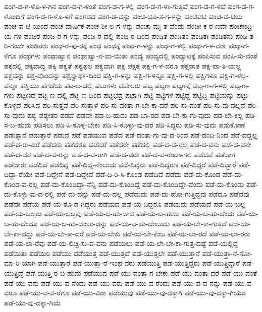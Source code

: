 {ಪಂಗ-ಡ-ಗ-ಳೊ-ಳ-ಗಿನ
ಪಂಗ-ಡ-ಗ-ಳಂತೆ
ಪಂಗ-ಡ-ಗ-ಳಲ್ಲಿ
ಪಂಗ-ಡ-ಗ-ಳಾ-ಗುತ್ತಿವೆ
ಪಂಗ-ಡ-ಗ-ಳಿವೆ
ಪಂಗ-ಡ-ಗ-ಳೊಂದಿಗೆ
ಪಂಗ-ಡ-ಗ-ಳೊ-ಳಗೆ
ಪಂಗಡದ
ಪಂಗ-ಡ-ವನ್ನು
ಪಂಚ-ಭೂ-ತ-ಗ-ಳನ್ನು
ಪಂಚವಟಿ
ಪಂಚ-ವ-ಟಿಯ
ಪಂಚ-ವ-ಟಿ-ಯಿಂದ
ಪಂಚ-ವಾರ್ಷಿಕ
ಪಂಚ-ಶೀ-ಲ-ಗ-ಳನ್ನು
ಪಂಚಾ-ಮೃ-ತ-ವೆಂದು
ಪಂಚೀ-ಕ-ರ-ಣವೇ
ಪಂಚೇಂದ್ರಿ-ಯ-ಗಳ
ಪಂಜರ
ಪಂಜ-ರ-ಗ-ಳನ್ನು
ಪಂಜ-ರ-ದಲ್ಲಿ
ಪಂಜ-ರ-ದಿಂದ
ಪಂಡಿತ
ಪಂಡಿತಂ
ಪಂಡಿತಃ
ಪಂಡಿತನು
ಪಂಡಿ-ತ-ರಿ-ಗಂದೇ
ಪಂಡಿತರು
ಪಂಢ-ರ-ಪು-ರಕ್ಕೆ
ಪಂಥ
ಪಂಥಕ್ಕೆ
ಪಂಥ-ಗ-ಳನ್ನು
ಪಂಥ-ಗ-ಳಲ್ಲಿ
ಪಂಥ-ಗ-ಳ-ವರೇ
ಪಂಥ-ಗ-ಳಿಗೂ
ಪಂಥಗಳು
ಪಂಥಾಹ್ವಾನ
ಪಂಥಾಹ್ವಾ-ನ-ವಾ-ಯಿತು
ಪಂದ್ಯ
ಪಂದ್ಯದಲ್ಲಿ
ಪಂದ್ಯಾಟಕ್ಕೆ
ಪಂಪಿಸುವ
ಪಂಪಿ-ಸು-ವಂತೆ
ಪಕ್ಕದಲ್ಲಿ
ಪಕ್ಕವಾದ್ಯ
ಪಕ್ಕಿ
ಪಕ್ವತೆ
ಪಕ್ವಫಲ
ಪಕ್ವವಾಗಿ
ಪಕ್ಷ
ಪಕ್ಷಕ್ಕೆ
ಪಕ್ಷ-ಗ-ಳ-ವರೂ
ಪಕ್ಷಪಾತ
ಪಕ್ಷ-ಪಾ-ತಿ-ಯಲ್ಲ
ಪಕ್ಷವನ್ನು
ಪಕ್ಷ-ವೊಂದನ್ನು
ಪಕ್ಷಸ್ವಾರ್ಥ-ದಿಂದ
ಪಕ್ಷಿ-ಗ-ಳನ್ನು
ಪಕ್ಷಿ-ಗ-ಳನ್ನೂ
ಪಕ್ಷಿ-ಗ-ಳಲ್ಲಿ
ಪಕ್ಷಿಗಳೂ
ಪಕ್ಷಿ-ಗ-ಳೆಲ್ಲ-ವನ್ನೂ
ಪಕ್ಷಿಯು
ಪಗಡೆಯ
ಪಟ-ಲ-ದಲ್ಲಿ
ಪಟುಗಳು
ಪಟೇಲರು
ಪಟ್ಟ
ಪಟ್ಟಣ
ಪಟ್ಟಣಕ್ಕೆ
ಪಟ್ಟ-ಣ-ಗ-ಳಲ್ಲಿ
ಪಟ್ಟ-ಣ-ಗಳು
ಪಟ್ಟಣದ
ಪಟ್ಟ-ಣ-ದಲ್ಲಿ
ಪಟ್ಟ-ಣ-ದಿಂದ
ಪಟ್ಟಭದ್ರ
ಪಟ್ಟಾಗಿ
ಪಟ್ಟಿ
ಪಟ್ಟಿಗಳ
ಪಟ್ಟಿದ್ದ
ಪಟ್ಟಿದ್ದಿ
ಪಟ್ಟಿಯನ್ನು
ಪಟ್ಟು-ಕೊಳ್ಳದೆ
ಪಠಿಸಿದ
ಪಠಿ-ಸುತ್ತವೆ
ಪಠಿ-ಸುತ್ತಾಳೆ
ಪಠಿ-ಸು-ವಂತಾ-ಗ-ಬೇ-ಕಾ-ದರೆ
ಪಠಿ-ಸು-ವಂತೆ
ಪಠಿ-ಸು-ವು-ದಲ್ಲವೆ
ಪಠಿ-ಸು-ವುದು
ಪಠ್ಯ
ಪಠ್ಯೇತರ
ಪಡದೆ
ಪಡದೇ
ಪಡ-ಬ-ಹುದು
ಪಡ-ಬಾ-ರದ
ಪಡ-ಬೇ-ಕಾ-ಗು-ವುದು
ಪಡ-ಬೇ-ಕಿಲ್ಲ
ಪಡಿ-ಸ-ಬ-ಹುದು
ಪಡಿಸಲು
ಪಡಿ-ಸಿ-ಕೊಳ್ಳ-ಬೇಕು
ಪಡಿ-ಸಿ-ಕೊಳ್ಳು-ವು-ದರ
ಪಡಿ-ಸಿದ್ದರು
ಪಡಿ-ಸು-ವುದು
ಪಡುಕೋಣೆ
ಪಡುತ್ತಾನೆ
ಪಡುತ್ತಾರೆ
ಪಡುವ
ಪಡೆ
ಪಡೆಯುವ
ಪಡೆದ
ಪಡೆ-ದಂತಾ-ಗು-ವು-ದ-ರಿಂದ
ಪಡೆ-ದಂದಿ-ನಿಂದ
ಪಡೆ-ದದ್ದಲ್ಲ
ಪಡೆ-ದ-ರಾ-ದರೆ
ಪಡೆದರು
ಪಡೆದರೂ
ಪಡೆದರೆ
ಪಡೆದರೇ
ಪಡೆದಲ್ಲಿ
ಪಡೆ-ದ-ವ-ನಲ್ಲ
ಪಡೆ-ದ-ವನು
ಪಡೆ-ದ-ವನೇ
ಪಡೆ-ದ-ವರ
ಪಡೆ-ದ-ವ-ರನ್ನು
ಪಡೆ-ದ-ವ-ರಾಗಿ
ಪಡೆ-ದ-ವರು
ಪಡೆ-ದ-ವ-ರೆಂದಾ-ಗಲಿ
ಪಡೆದವೆ
ಪಡೆದಾಗ
ಪಡೆದಾರು
ಪಡೆದಿದೆ
ಪಡೆದಿದ್ದ
ಪಡೆ-ದಿದ್ದ-ನೆಂಬುದು
ಪಡೆ-ದಿದ್ದರು
ಪಡೆ-ದಿದ್ದರೂ
ಪಡೆ-ದಿದ್ದರೆ
ಪಡೆ-ದಿದ್ದಾರೆ
ಪಡೆ-ದಿದ್ದಾ-ರೆಯೇ
ಪಡೆ-ದಿದ್ದೇನೆ
ಪಡೆ-ದಿದ್ದೇವೆ
ಪಡೆ-ದಿ-ರಿ-ಸಿ-ಕೊಂಡ
ಪಡೆದಿವೆ
ಪಡೆದು
ಪಡೆ-ದು-ಕೊಂಡ
ಪಡೆ-ದು-ಕೊಂಡ-ವ-ರಲ್ಲ
ಪಡೆ-ದು-ಕೊಂಡಿದ್ದಾ-ನೆನ್ನಿ
ಪಡೆ-ದು-ಕೊಂಡಿದ್ದೆ
ಪಡೆ-ದು-ಕೊಂಡಿದ್ದೇ-ವೆಂದು
ಪಡೆ-ದು-ಕೊಂಡು
ಪಡೆ-ದು-ಕೊಳ್ಳು-ವು-ದ-ರಲ್ಲಿ
ಪಡೆ-ದು-ದನ್ನು
ಪಡೆ-ದು-ದಲ್ಲ
ಪಡೆದುದು
ಪಡೆ-ದು-ಹೋ-ಗುತ್ತಿದ್ದವು
ಪಡೆದೂ
ಪಡೆದೆವು
ಪಡೆದೇ
ಪಡೆಯ
ಪಡೆ-ಯ-ತೊ-ಡ-ಗಿದ್ದರು
ಪಡೆಯದ
ಪಡೆ-ಯ-ದಿದ್ದರೂ
ಪಡೆಯದು
ಪಡೆಯದೆ
ಪಡೆ-ಯ-ಬಲ್ಲ
ಪಡೆ-ಯ-ಬಲ್ಲರು
ಪಡೆ-ಯ-ಬಲ್ಲವು
ಪಡೆ-ಯ-ಬ-ಹು-ದಾದ
ಪಡೆ-ಯ-ಬ-ಹುದು
ಪಡೆ-ಯ-ಬ-ಹು-ದೆಂದು
ಪಡೆ-ಯ-ಬ-ಹು-ದೆಂದೂ
ಪಡೆ-ಯ-ಬ-ಹು-ದೆಂಬು-ದನ್ನು
ಪಡೆ-ಯ-ಬ-ಹು-ದೆಂಬುದು
ಪಡೆ-ಯ-ಬೇ-ಕಾ-ಗುತ್ತದೆ
ಪಡೆ-ಯ-ಬೇ-ಕಾ-ದದ್ದು
ಪಡೆ-ಯ-ಬೇ-ಕಾ-ದರೆ
ಪಡೆ-ಯ-ಬೇಕು
ಪಡೆ-ಯ-ಬೇ-ಕೆಂಬ
ಪಡೆ-ಯ-ಲಾ-ರದೆ
ಪಡೆ-ಯ-ಲಾ-ರರು
ಪಡೆ-ಯ-ಲಾ-ರೆವು
ಪಡೆ-ಯ-ಲಿಚ್ಛಿ-ಸು-ವ-ವನು
ಪಡೆಯಲು
ಪಡೆ-ಯ-ಲೇ-ಬೇ-ಕಾ-ಗುತ್ತ-ದಷ್ಟೆ
ಪಡೆ-ಯಲ್ಲಿದ್ದ
ಪಡೆಯಿತು
ಪಡೆಯಿರಿ
ಪಡೆಯು
ಪಡೆಯುತ್ತ
ಪಡೆ-ಯುತ್ತದೆ
ಪಡೆ-ಯುತ್ತಲೇ
ಪಡೆ-ಯುತ್ತಾನೆ
ಪಡೆ-ಯುತ್ತಾ-ನೆ-ಸೋ-ಮಾ-ರಿ-ಯಾಗಿ
ಪಡೆ-ಯುತ್ತಾರೆ
ಪಡೆ-ಯುತ್ತಾ-ರೆ-ಇಂಥ-ವರು
ಪಡೆಯುತ್ತಿ
ಪಡೆ-ಯುತ್ತಿದ್ದರು
ಪಡೆ-ಯುತ್ತಿದ್ದಾರೆ
ಪಡೆ-ಯುತ್ತಿದ್ದೆ
ಪಡೆ-ಯುತ್ತಿ-ರ-ಬ-ಹುದು
ಪಡೆಯುವ
ಪಡೆ-ಯು-ವಂತಾ-ಗ-ಬೇಕು
ಪಡೆ-ಯು-ವಂತಾ-ದರೆ
ಪಡೆ-ಯು-ವಂತೆ
ಪಡೆ-ಯು-ವನು
ಪಡೆ-ಯು-ವ-ನೆಂದು
ಪಡೆ-ಯು-ವರು
ಪಡೆ-ಯು-ವ-ರೆಂದು
ಪಡೆ-ಯು-ವ-ವ-ನನ್ನು
ಪಡೆ-ಯು-ವ-ವರೂ
ಪಡೆ-ಯು-ವ-ವ-ರೆಗೂ
ಪಡೆ-ಯು-ವಿರಾ
ಪಡೆಯುವು
ಪಡೆ-ಯು-ವು-ದಕ್ಕಾಗಿ
ಪಡೆ-ಯು-ವು-ದಕ್ಕಾ-ಗಿಯೂ
ಪಡೆ-ಯು-ವು-ದಕ್ಕಾ-ಗಿಯೆ
}
